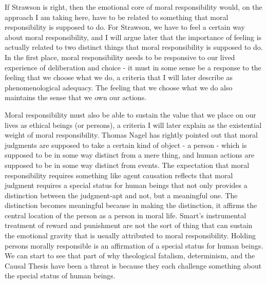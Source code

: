 \documentclass[phd,12pt,oneside,paper=letterpaper]{ubcthesis}
\begin{document}
If Strawson is right, then the emotional core of moral responsibility would, on the approach I am taking here, have to be related to something that moral responsibility is supposed to do. For Strawson, we have to feel a certain way about moral responsibility, and I will argue later that the importance of feeling is actually related to two distinct things that moral responsibility is supposed to do. In the first place, moral responsibility needs to be responsive to our lived experience of deliberation and choice - it must in some sense be a response to the feeling that we choose what we do, a criteria that I will later describe as phenomenological adequacy. The feeling that we choose what we do also maintains the sense that we own our actions.

Moral responsibility must also be able to sustain the value that we place on our lives as ethical beings (or persons), a criteria I will later explain as the existential weight of moral responsibility. Thomas Nagel \citeyearpar{nagel1979b} has rightly pointed out that moral judgments are supposed to take a certain kind of object - a person - which is supposed to be in some way distinct from a mere thing, and human actions are supposed to be in some way distinct from events. The expectation that moral responsibility requires something like agent causation reflects that moral judgment requires a special status for human beings that not only provides a distinction between the judgment-apt and not, but a meaningful one. The distinction becomes meaningful because in making the distinction, it affirms the central location of the person as a person in moral life. Smart's instrumental treatment of reward and punishment are not the sort of thing that can sustain the emotional gravity that is usually attributed to moral responsibility. Holding persons morally responsible is an affirmation of a special status for human beings. We can start to see that part of why theological fatalism, determinism, and the Causal Thesis have been a threat is because they each challenge something about the special status of human beings.
\end{document}
